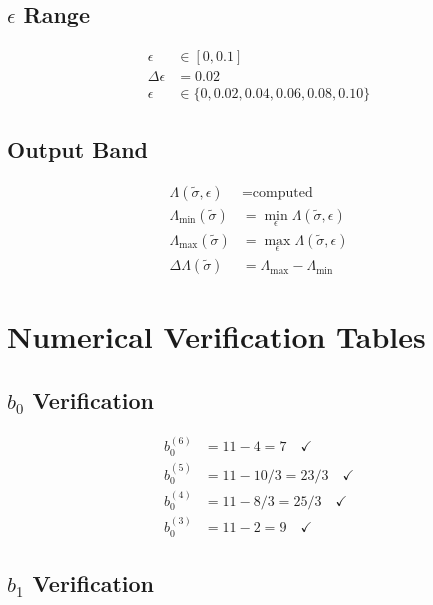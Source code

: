 \documentclass[11pt,a4paper]{article}
\theoremstyle{definition}
\begin{document}
\subsection{$\epsilon$ Range}
\label{subsec:sweep-epsilon}

\begin{align}
\label{eq:sweep-4}
\epsilon &\in [0, 0.1] \\
\label{eq:sweep-5}
\Delta\epsilon &= 0.02 \\
\label{eq:sweep-6}
\epsilon &\in \{0, 0.02, 0.04, 0.06, 0.08, 0.10\}
\end{align}

\subsection{Output Band}
\label{subsec:sweep-output}

\begin{align}
\label{eq:sweep-7}
\Lambda(\tilde{\sigma}, \epsilon) &= \text{computed} \\
\label{eq:sweep-8}
\Lambda_{\min}(\tilde{\sigma}) &= \min_\epsilon \Lambda(\tilde{\sigma}, \epsilon) \\
\label{eq:sweep-9}
\Lambda_{\max}(\tilde{\sigma}) &= \max_\epsilon \Lambda(\tilde{\sigma}, \epsilon) \\
\label{eq:sweep-10}
\Delta\Lambda(\tilde{\sigma}) &= \Lambda_{\max} - \Lambda_{\min}
\end{align}

\section{Numerical Verification Tables}
\label{app:num-tables}

\subsection{$b_0$ Verification}
\label{subsec:num-b0}

\begin{align}
\label{eq:num-1}
b_0^{(6)} &= 11 - 4 = 7 \quad \checkmark \\
\label{eq:num-2}
b_0^{(5)} &= 11 - 10/3 = 23/3 \quad \checkmark \\
\label{eq:num-3}
b_0^{(4)} &= 11 - 8/3 = 25/3 \quad \checkmark \\
\label{eq:num-4}
b_0^{(3)} &= 11 - 2 = 9 \quad \checkmark
\end{align}

\subsection{$b_1$ Verification}
\label{subsec:num-b1}
\end{document}
